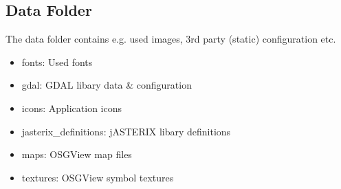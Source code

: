 \begin{itemize}
\end{itemize}


\subsection{Data Folder}
\label{sec:appendix_config_data_folder}

The data folder contains e.g. used images, 3rd party (static) configuration etc.

\begin{itemize}
\item fonts: Used fonts
\item gdal: GDAL libary data \& configuration
\item icons: Application icons
\item jasterix\_definitions: jASTERIX libary definitions
\item maps: OSGView map files
\item textures: OSGView symbol textures
\end{itemize}

